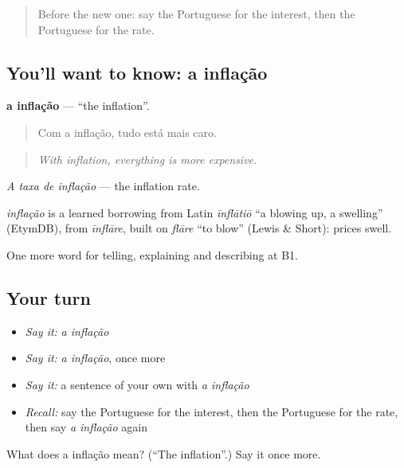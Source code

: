 \label{lesson:PT-C392-inflacao}



\begin{quote}
Before the new one: say the Portuguese for the interest, then the Portuguese for the rate.
\end{quote}

\subsection*{You'll want to know: a inflação}
\textbf{a inflação} — \textquotedblleft{}the inflation\textquotedblright{}.

\begin{quote}
Com a inflação, tudo está mais caro.
\end{quote}

\begin{quote}
\emph{With inflation, everything is more expensive.}
\end{quote}

\emph{A taxa de inflação} — the inflation rate.

\begin{cousinweb}
\emph{inflação} is a learned borrowing from Latin \emph{īnflātiō} \textquotedblleft{}a blowing up, a swelling\textquotedblright{} (EtymDB), from \emph{īnflāre}, built on \emph{flāre} \textquotedblleft{}to blow\textquotedblright{} (Lewis \& Short): prices swell.
\end{cousinweb}

\begin{grammarlens}[title={What you've built}]
One more word for telling, explaining and describing at B1.
\end{grammarlens}

\subsection*{Your turn}
\begin{itemize}
\raggedright
  \item \emph{Say it:} \emph{a inflação}
  \item \emph{Say it:} \emph{a inflação}, once more
  \item \emph{Say it:} a sentence of your own with \emph{a inflação}
  \item \emph{Recall:} say the Portuguese for the interest, then the Portuguese for the rate, then say \emph{a inflação} again
\end{itemize}

\begin{tcolorbox}[breakable,colback=teal!4,colframe=teal!35!black,title={Before you move on}]
What does a inflação mean? (\textquotedblleft{}The inflation\textquotedblright{}.) Say it once more.
\end{tcolorbox}
